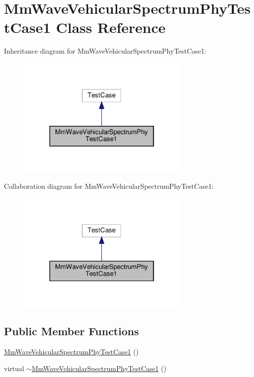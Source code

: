 \hypertarget{classMmWaveVehicularSpectrumPhyTestCase1}{}\section{Mm\+Wave\+Vehicular\+Spectrum\+Phy\+Test\+Case1 Class Reference}
\label{classMmWaveVehicularSpectrumPhyTestCase1}


Inheritance diagram for Mm\+Wave\+Vehicular\+Spectrum\+Phy\+Test\+Case1\+:\nopagebreak
\begin{figure}[H]
\begin{center}
\leavevmode
\includegraphics[width=238pt]{classMmWaveVehicularSpectrumPhyTestCase1__inherit__graph}
\end{center}
\end{figure}


Collaboration diagram for Mm\+Wave\+Vehicular\+Spectrum\+Phy\+Test\+Case1\+:\nopagebreak
\begin{figure}[H]
\begin{center}
\leavevmode
\includegraphics[width=238pt]{classMmWaveVehicularSpectrumPhyTestCase1__coll__graph}
\end{center}
\end{figure}
\subsection*{Public Member Functions}
\begin{DoxyCompactItemize}
\item 
\hyperlink{classMmWaveVehicularSpectrumPhyTestCase1_acbe3f1ab9c9eb3aa37dc8501240df04a}{Mm\+Wave\+Vehicular\+Spectrum\+Phy\+Test\+Case1} ()
\item 
virtual \hyperlink{classMmWaveVehicularSpectrumPhyTestCase1_a4317647a74efd1008350f294484eab1b}{$\sim$\+Mm\+Wave\+Vehicular\+Spectrum\+Phy\+Test\+Case1} ()
\end{DoxyCompactItemize}


